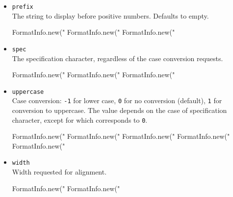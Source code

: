 \begin{itemize}
\item \lstinline|prefix|\\
  The string to display before positive numbers.  Defaults to empty.
\begin{urbiassert}
FormatInfo.new("%
FormatInfo.new("%
FormatInfo.new("%
\end{urbiassert}

\item \lstinline|spec|\\
  The specification character, regardless of the case conversion
  requests.
\begin{urbiassert}
FormatInfo.new("%
FormatInfo.new("%
FormatInfo.new("%
\end{urbiassert}

\item \lstinline|uppercase|\\
  Case conversion: \lstinline|-1| for lower case, \lstinline|0| for no
  conversion (default), \lstinline|1| for conversion to uppercase.
  The value depends on the case of specification character, except for
   which corresponds to \lstinline|0|.
\begin{urbiassert}
FormatInfo.new("%
FormatInfo.new("%
FormatInfo.new("%
FormatInfo.new("%
FormatInfo.new("%
\end{urbiassert}

\item \lstinline|width|\\
  Width requested for alignment.
\begin{urbiassert}
FormatInfo.new("%
FormatInfo.new("%
\end{urbiassert}
\end{itemize}

